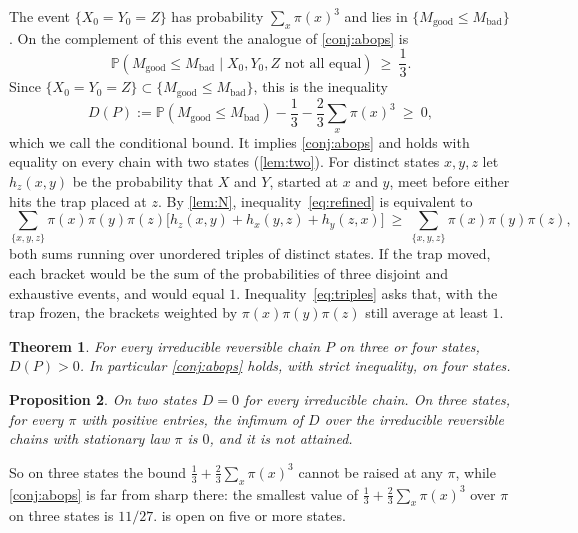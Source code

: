 \documentclass[11pt,a4paper]{article}
\numberwithin{equation}{section}
\newtheorem{theorem}{Theorem}[section]
\newtheorem{proposition}[theorem]{Proposition}
\theoremstyle{remark}
\newcommand{\Pp}{\mathbb P}
\newcommand{\good}{M_{\mathrm{good}}}
\newcommand{\bad}{M_{\mathrm{bad}}}
\begin{document}
The event $\{X_0=Y_0=Z\}$ has probability $\sum_x\pi(x)^3$ and lies in $\{\good\le\bad\}$. On the complement of this event the analogue of \cref{conj:abops} is
\[
\Pp(\good\le\bad\mid X_0,Y_0,Z\text{ not all equal})\ \ge\ \frac13 .
\]
Since $\{X_0=Y_0=Z\}\subset\{\good\le\bad\}$, this is the inequality
\begin{equation}\label{eq:refined}
D(P):=\Pp(\good\le\bad)-\frac13-\frac23\sum_x\pi(x)^3\ \ge\ 0,
\end{equation}
which we call the conditional bound. It implies \cref{conj:abops} and holds with equality on every chain with two
states (\cref{lem:two}). For distinct states $x,y,z$ let $h_z(x,y)$ be the probability that $X$ and $Y$, started at $x$ and $y$, meet before either hits the trap placed at $z$. By \cref{lem:N}, inequality~\eqref{eq:refined} is equivalent to
\begin{equation}\label{eq:triples}
\sum_{\{x,y,z\}}\pi(x)\pi(y)\pi(z)\bigl[h_z(x,y)+h_x(y,z)+h_y(z,x)\bigr]\ \ge\ \sum_{\{x,y,z\}}\pi(x)\pi(y)\pi(z),
\end{equation}
both sums running over unordered triples of distinct states. If the trap moved, each bracket would be the sum of the probabilities of three disjoint and exhaustive events, and would equal $1$. Inequality~\eqref{eq:triples} asks that, with the trap frozen, the brackets weighted by $\pi(x)\pi(y)\pi(z)$ still average at least $1$.

\begin{theorem}\label{thm:main}
For every irreducible reversible chain $P$ on three or four states, $D(P)>0$. In particular \cref{conj:abops} holds, with strict inequality, on four states.
\end{theorem}

\begin{proposition}\label{prop:sharp}
On two states $D=0$ for every irreducible chain. On three states, for every $\pi$ with positive entries, the infimum of $D$ over the irreducible reversible chains with stationary law $\pi$ is $0$, and it is not attained.
\end{proposition}

So on three states the bound $\tfrac13+\tfrac23\sum_x\pi(x)^3$ cannot be raised at any $\pi$, while \cref{conj:abops} is far from sharp there: the smallest value of $\tfrac13+\tfrac23\sum_x\pi(x)^3$ over $\pi$ on three states is $11/27$.  is open on five or more states.
\end{document}
